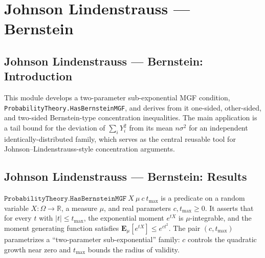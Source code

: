 \section{Johnson Lindenstrauss --- Bernstein}
\subsection*{Johnson Lindenstrauss --- Bernstein: Introduction}

This module develops a two-parameter sub-exponential MGF condition,
\texttt{ProbabilityTheory.HasBernsteinMGF}, and derives from it
one-sided, other-sided, and two-sided Bernstein-type concentration
inequalities.  The main application is a tail bound for the deviation
of $\sum_i Y_i^2$ from its mean $n\sigma^2$ for an independent
identically-distributed family, which serves as the central reusable
tool for Johnson--Lindenstrauss-style concentration arguments.

\subsection*{Johnson Lindenstrauss --- Bernstein: Results}

\begin{definition}
\label{ProbabilityTheory.HasBernsteinMGF}
\leanok
$\texttt{ProbabilityTheory.HasBernsteinMGF}\ X\ \mu\ c\ t_{\max}$ is a
predicate on a random variable $X : \Omega \to \mathbb{R}$, a measure
$\mu$, and real parameters $c, t_{\max} \ge 0$.  It asserts that for
every $t$ with $|t| \le t_{\max}$, the exponential moment
$e^{tX}$ is $\mu$-integrable, and the moment generating function
satisfies $\mathbf{E}_\mu[e^{tX}] \le e^{c t^2}$.  The pair
$(c, t_{\max})$ parametrizes a ``two-parameter sub-exponential'' family:
$c$ controls the quadratic growth near zero and $t_{\max}$ bounds the
radius of validity.
\end{definition}

